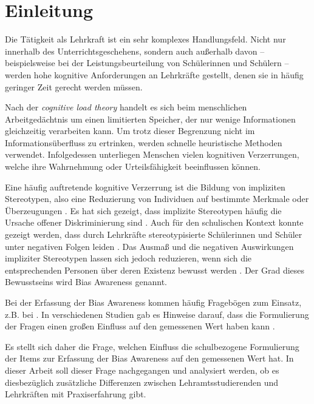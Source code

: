 \chapter{Einleitung}
\label{ch:einleitung}

Die Tätigkeit als Lehrkraft ist ein sehr komplexes Handlungsfeld.
Nicht nur innerhalb des Unterrichtsgeschehens, sondern auch außerhalb davon -- beispielsweise bei der Leistungsbeurteilung von Schülerinnen und Schülern -- werden hohe kognitive Anforderungen an Lehrkräfte gestellt, denen sie in häufig geringer Zeit gerecht werden müssen.

Nach der \emph{cognitive load theory} \citep{atkinson1968human} handelt es sich beim menschlichen Arbeitgedächtnis um einen limitierten Speicher, der nur wenige Informationen gleichzeitig verarbeiten kann.
Um trotz dieser Begrenzung nicht im Informationsüberfluss zu ertrinken, werden schnelle heuristische Methoden verwendet.
Infolgedessen unterliegen Menschen vielen kognitiven Verzerrungen, welche ihre Wahrnehmung oder Urteilsfähigkeit beeinflussen können.

Eine häufig auftretende kognitive Verzerrung ist die Bildung von impliziten Stereotypen, also eine Reduzierung von Individuen auf bestimmte Merkmale oder Überzeugungen \citep{greenwald1995implicit}.
Es hat sich gezeigt, dass implizite Stereotypen häufig die Ursache offener Diskriminierung sind \citep{agerstrom2011role, picho2013exploring}.
Auch für den schulischen Kontext konnte gezeigt werden, dass durch Lehrkräfte stereotypisierte Schülerinnen und Schüler unter negativen Folgen leiden \citep{martiny2020theoretischer}.
Das Ausmaß und die negativen Auswirkungen impliziter Stereotypen lassen sich jedoch reduzieren, wenn sich die entsprechenden Personen über deren Existenz bewusst werden \citep{monteith1993self, perry2015modern}.
Der Grad dieses Bewusstseins wird Bias Awareness genannt.

Bei der Erfassung der Bias Awareness kommen häufig Fragebögen zum Einsatz, z.B. bei \citet{perry2015modern}.
In verschiedenen Studien gab es Hinweise darauf, dass die Formulierung der Fragen einen großen Einfluss auf den gemessenen Wert haben kann \citep{kaminski2017situational, bing2004incremental, guyatt1999effect}.

Es stellt sich daher die Frage, welchen Einfluss die schulbezogene Formulierung der Items zur Erfassung der Bias Awareness auf den gemessenen Wert hat.
In dieser Arbeit soll dieser Frage nachgegangen und analysiert werden, ob es diesbezüglich zusätzliche Differenzen zwischen Lehramtsstudierenden und Lehrkräften mit Praxiserfahrung gibt.